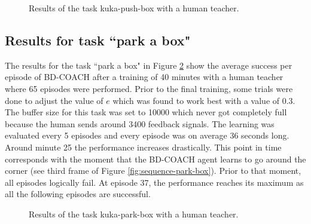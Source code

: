 

 \begin{figure}[H]
  \centering

   \caption{Results of the task kuka-push-box with a human teacher.}
  \label{fig:kukapush}
\end{figure}


\subsection{Results for task ``park a box"}
\label{subsection:results_kuka_park}

The results for the task ``park a box" in Figure \ref{fig:kukapark} show the average success per episode of BD-COACH after a training of 40 minutes with a human teacher where 65 episodes were performed. Prior to the final training, some trials were done to adjust the value of $e$ which was found to work best with a value of 0.3. The buffer size for this task was set to 10000 which never got completely full because the human sends around 3400 feedback signals.
The learning was evaluated every 5 episodes and every episode was on average 36 seconds long. Around minute 25 the performance increases drastically. This point in time corresponds with the moment that the BD-COACH agent learns to go around the corner (see third frame of Figure \ref{fig:sequence-park-box}). Prior to that moment, all episodes logically fail. At episode 37, the performance reaches its maximum as all the following episodes are successful.



 \begin{figure}[H]
  \centering

   \caption{Results of the task kuka-park-box with a human teacher.}
  \label{fig:kukapark}
\end{figure}




